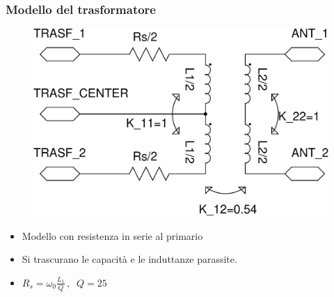 \documentclass{beamer}
\begin{document}
%
\begin{frame}
\frametitle{Modello del trasformatore}
\begin{figure}
\includegraphics[height=0.4\textheight]{images/trasf_model.pdf}
\end{figure}
\begin{itemize}
	\item Modello con resistenza in serie al primario
	\item Si trascurano le capacit\`a e le induttanze parassite.
	\item $R_s=\omega_0 \frac{L_1}{Q}\, ,\;\; Q=25$
\end{itemize}
\end{frame}
%
\end{document}
